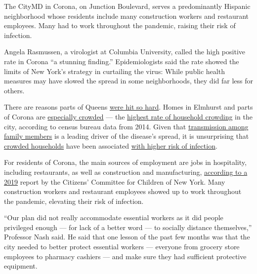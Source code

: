 The CityMD in Corona, on Junction Boulevard, serves a predominantly
Hispanic neighborhood whose residents include many construction workers
and restaurant employees. Many had to work throughout the pandemic,
raising their risk of infection.

Angela Rasmussen, a virologist at Columbia University, called the high
positive rate in Corona ``a stunning finding.'' Epidemiologists said the
rate showed the limits of New York's strategy in curtailing the virus:
While public health measures may have slowed the spread in some
neighborhoods, they did far less for others.

There are reasons parts of Queens
\href{https://www.nytimes3xbfgragh.onion/2020/04/09/nyregion/coronavirus-queens-corona-jackson-heights-elmhurst.html}{were
hit so hard}. Homes in Elmhurst and parts of Corona are
\href{https://www.nytimes3xbfgragh.onion/interactive/2019/10/23/nyregion/basements-queens-immigrants.html}{especially
crowded} --- the
\href{https://www.nytimes3xbfgragh.onion/2016/03/01/nyregion/overcrowding-worsens-in-new-york-as-working-families-double-up.html}{highest
rate of household crowding} in the city, according to census bureau data
from 2014. Given that
\href{https://www.who.int/docs/default-source/coronaviruse/who-china-joint-mission-on-covid-19-final-report.pdf}{transmission
among family members} is a leading driver of the disease's spread, it is
unsurprising that
\href{https://www.wsj.com/articles/covid-19-households-spread-coronavirus-families-navajo-california-second-wave-11591553896}{crowded
households} have been associated
\href{https://www.cuimc.columbia.edu/news/crowded-homes-poor-neighborhoods-linked-covid-19}{with
higher risk of infection}.

For residents of Corona, the main sources of employment are jobs in
hospitality, including restaurants, as well as construction and
manufacturing,
\href{https://www.cccnewyork.org/wp-content/uploads/2019/12/FINAL-CCC-Elmhurst-Corona_SinglePages_1216.pdf}{according
to a 2019} report by the Citizens' Committee for Children of New York.
Many construction workers and restaurant employees showed up to work
throughout the pandemic, elevating their risk of infection.

``Our plan did not really accommodate essential workers as it did people
privileged enough --- for lack of a better word --- to socially distance
themselves,'' Professor Nash said. He said that one lesson of the past
few months was that the city needed to better protect essential workers
--- everyone from grocery store employees to pharmacy cashiers --- and
make sure they had sufficient protective equipment.


